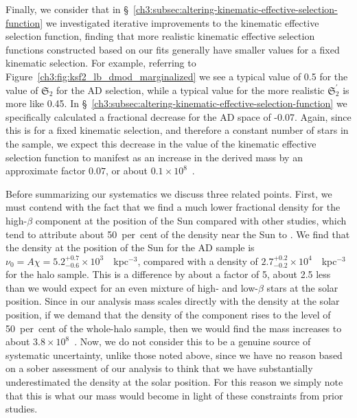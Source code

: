 Finally, we consider that in \S~\ref{ch3:subsec:altering-kinematic-effective-selection-function} we investigated iterative improvements to the kinematic effective selection function, finding that more realistic kinematic effective selection functions constructed based on our fits generally have smaller values for a fixed kinematic selection. For example, referring to Figure~\ref{ch3:fig:ksf2_lb_dmod_marginalized} we see a typical value of 0.5 for the value of $\mathfrak{S}_{2}$ for the AD selection, while a typical value for the more realistic $\mathfrak{S}_{2}^{\prime}$ is more like 0.45. In \S~\ref{ch3:subsec:altering-kinematic-effective-selection-function} we specifically calculated a fractional decrease for the AD space of -0.07. Again, since this is for a fixed kinematic selection, and therefore a constant number of stars in the sample, we expect this decrease in the value of the kinematic effective selection function to manifest as an increase in the derived mass by an approximate factor $0.07$, or about $0.1\times10^{8}$~\Msun.

Before summarizing our systematics we discuss three related points. First, we must contend with the fact that we find a much lower fractional density for the high-$\beta$ \gse component at the position of the Sun compared with other studies, which tend to attribute about 50~per~cent of the density near the Sun to \gse \parencite{belokurov18,lancaster19,iorio21}. We find that the density at the position of the Sun for the AD sample is $\nu_{0} = A\chi = 5.2^{+0.7}_{-0.6}\times 10^{3}$~\Msun~kpc$^{-3}$, compared with a density of $2.7^{+0.2}_{-0.2}\times 10^{4}$~\Msun~kpc$^{-3}$ for the halo sample. This is a difference by about a factor of 5, about 2.5 less than we would expect for an even mixture of high- and low-$\beta$ stars at the solar position. Since in our analysis mass scales directly with the density at the solar position, if we demand that the density of the \gse component rises to the level of 50~per~cent of the whole-halo sample, then we would find the mass increases to about $3.8\times10^{8}$~\Msun. Now, we do not consider this to be a genuine source of systematic uncertainty, unlike those noted above, since we have no reason based on a sober assessment of our analysis to think that we have substantially underestimated the density at the solar position. For this reason we simply note that this is what our mass would become in light of these constraints from prior studies.


